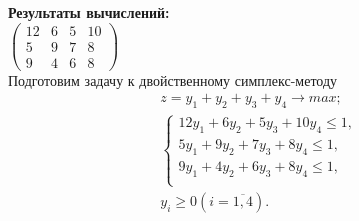 \documentclass[a4paper,14pt]{extarticle}
\begin{document}
\textbf{Результаты вычислений: }\\
$
\begin{pmatrix}
12&6&5&10\\
5&9&7&8\\
9&4&6&8
\end{pmatrix}
$\\
Подготовим задачу к двойственному симплекс-методу
\begin{equation*}
    \begin{aligned}
        z = y_1 + y_2 + y_3 + y_4 \rightarrow max; \\
        \begin{cases}
            12y_1 + 6y_2 + 5y_3 + 10y_4 \leq 1, \\
            5y_1 + 9y_2 + 7y_3 + 8y_4 \leq 1,    \\
            9y_1 + 4y_2 + 6y_3 + 8y_4 \leq 1,  \\
        \end{cases}                \\
        y_i \geq 0 (i=\overline{1, 4}).
    \end{aligned}
\end{equation*}\\
\end{document}
